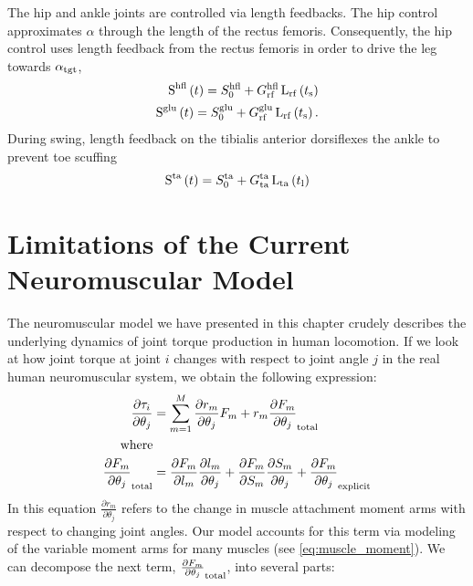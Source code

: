 The hip and ankle joints are controlled via length feedbacks. The hip control
approximates $\alpha$ through the length of the rectus femoris. Consequently,
the hip control uses length feedback from the rectus femoris in order to drive
the leg towards $\alpha_{\mathrm{tgt}}$,
\begin{align}
    \func{S}[][\tn{hfl}]{t} = S_0^\tn{hfl} + G_\tn{rf}^\tn{hfl}
        \func{L}[\tn{rf}]{t_\tn{s}} \\
    \func{S}[][\tn{glu}]{t} = S_0^\tn{glu} + G_\tn{rf}^\tn{glu}
        \func{L}[\tn{rf}]{t_\tn{s}}.
\end{align}
During swing, length feedback on the tibialis anterior dorsiflexes the ankle to
prevent toe scuffing
\begin{align}
    \func{S}[][\tn{ta}]{t} = S_0^\tn{ta} + G_\tn{ta}^\tn{ta}
        \func{L}[\tn{ta}]{t_\tn{l}}
\end{align}

\section{Limitations of the Current Neuromuscular Model}

The neuromuscular model we have presented in this chapter crudely describes the
underlying dynamics of joint torque production in human locomotion. If we look
at how joint torque at joint $i$ changes with respect to joint angle $j$ in the
real human neuromuscular system, we obtain the following expression:
\begin{align}
    \frac{\partial \tau_i}{\partial \theta_j} &= \sum_{m=1}^M \frac{\partial
    r_m}{\partial \theta_j} F_m + r_m \frac{\partial F_m}{\partial
    \theta_j}_{\mathrm{total}} \\
    \textrm{where} & \notag \\
    \frac{\partial F_m}{\partial \theta_j}_{\mathrm{total}}&= 
        \frac{\partial F_m}{\partial l_m}
            \frac{\partial l_m}{\partial \theta_j} 
        + \frac{\partial F_m}{\partial S_m}
            \frac{\partial S_m}{\partial \theta_j} 
        + \frac{\partial F_m}{\partial \theta_j}_{\mathrm{explicit}}
\end{align}
In this equation $\frac{\partial r_m}{\partial \theta_j}$ refers to the change
in muscle attachment moment arms with respect to changing joint angles. Our
model accounts for this term via modeling of the variable moment arms for many
muscles (see \cref{eq:muscle_moment}). We can decompose the next term,
$\frac{\partial F_m}{\partial \theta_j}_{\mathrm{total}}$, into several parts:

